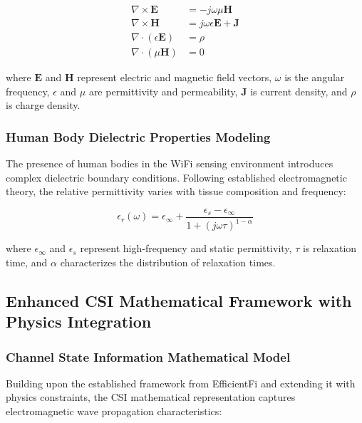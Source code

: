\documentclass[journal]{IEEEtran}
\begin{document}
\begin{align}
\nabla \times \mathbf{E} &= -j\omega \mu \mathbf{H} \label{eq:maxwell_faraday} \\
\nabla \times \mathbf{H} &= j\omega \epsilon \mathbf{E} + \mathbf{J} \label{eq:maxwell_ampere} \\
\nabla \cdot (\epsilon \mathbf{E}) &= \rho \label{eq:maxwell_gauss} \\
\nabla \cdot (\mu \mathbf{H}) &= 0 \label{eq:maxwell_magnetic}
\end{align}

where $\mathbf{E}$ and $\mathbf{H}$ represent electric and magnetic field vectors, $\omega$ is the angular frequency, $\epsilon$ and $\mu$ are permittivity and permeability, $\mathbf{J}$ is current density, and $\rho$ is charge density.

\subsubsection{Human Body Dielectric Properties Modeling}

The presence of human bodies in the WiFi sensing environment introduces complex dielectric boundary conditions. Following established electromagnetic theory, the relative permittivity varies with tissue composition and frequency:

\begin{equation}
\epsilon_r(\omega) = \epsilon_{\infty} + \frac{\epsilon_s - \epsilon_{\infty}}{1 + (j\omega\tau)^{1-\alpha}}
\label{eq:dielectric_model}
\end{equation}

where $\epsilon_{\infty}$ and $\epsilon_s$ represent high-frequency and static permittivity, $\tau$ is relaxation time, and $\alpha$ characterizes the distribution of relaxation times.

\subsection{Enhanced CSI Mathematical Framework with Physics Integration}

\subsubsection{Channel State Information Mathematical Model}

Building upon the established framework from EfficientFi \cite{chen2024efficientfi} and extending it with physics constraints, the CSI mathematical representation captures electromagnetic wave propagation characteristics:
\end{document}
